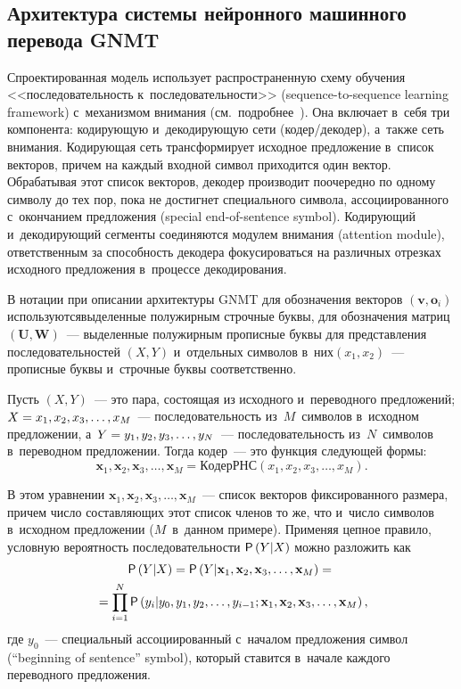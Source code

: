 \begin{multicols}{2}
  \section{Архитектура системы нейронного машинного перевода 
GNMT}
  
  Спроектированная модель использует распространенную схему обучения 
<<последовательность к~последовательности>> (sequence-to-sequence learning 
framework) с~механизмом внимания (см.\ подробнее~\cite{1-nur, 16-nur}). Она 
включает в~себя три компонента: кодирующую и~декодирующую сети  
(ко\-дер/де\-ко\-дер), а~также сеть внимания. Кодирующая сеть 
трансформирует исходное предложение в~список векторов, причем на каждый 
входной символ приходится один вектор. Обрабатывая этот список векторов, 
декодер производит поочередно по одному символу до тех пор, пока не 
достигнет специального символа, ассоциированного с~окончанием предложения 
(special end-of-sentence symbol). Кодирующий и~декодирующий сегменты 
соединяются модулем внимания (attention module), ответственным за 
способность декодера фокусироваться на различных отрезках исходного 
предложения в~процессе декодирования.
  
  В нотации при описании архитектуры \mbox{GNMT} для обозначения векторов 
$(\mathbf{v}, \mathbf{o}_i)$ используются\linebreak выделенные полужирным строчные 
буквы, для обозначения матриц $(\mathbf{U}, \mathbf{W})$~--- выделенные %
полужирным прописные буквы
для представления последовательностей $(X, Y)$ 
и~отдельных символов в~них\linebreak $(x_1, x_2)$~--- прописные буквы и~строчные 
буквы со\-от\-вет\-ст\-венно.
  
  Пусть $(X, Y)$~--- это пара, состоящая из исходного и~переводного 
предложений; $X\hm= x_1, x_2, x_3,\ldots , x_M$~--- последовательность 
из~$M$~символов в~исходном предложении, а~$Y\hm= y_1, y_2, y_3, \ldots , 
y_N$~--- последовательность из~$N$~символов в~переводном предложении. 
Тогда кодер~--- это функция следующей формы:
  $$
  \mathbf{x}_1, \mathbf{x}_2, \mathbf{x}_3,\ldots , 
\mathbf{x}_M=\mathrm{КодерРНС}\left( x_1, x_2, x_3,\ldots , x_M\right).
  $$
  
  В этом уравнении $\mathbf{x}_1, \mathbf{x}_2, \mathbf{x}_3,\ldots , 
\mathbf{x}_M$~--- список векторов фиксированного размера, причем чис\-ло 
составляющих этот список членов то же, что и~чис\-ло символов в~исходном 
предложении ($M$~в~данном примере). Применяя цепное правило, условную 
вероятность последовательности ${\sf P}\,(Y\vert X)$ можно разложить как
  \begin{multline*}
  {\sf P}\left(Y\vert X\right)={\sf P}\left(Y\vert \mathbf{x}_1, \mathbf{x}_2, \mathbf{x}_3,\ldots , 
\mathbf{x}_M\right) ={}\\
  {}= \prod\limits^N_{i=1} {\sf P}\left( y_i\vert y_0, y_1, y_2, \ldots , y_{i-1}; 
\mathbf{x}_1, \mathbf{x}_2, \mathbf{x}_3,\ldots, \mathbf{x}_M\right),
 \end{multline*}
где $y_0$~--- специальный ассоциированный с~началом предложения символ 
(``beginning of sentence'' symbol), который ставится в~начале каждого 
переводного предложения.


\end{multicols}
